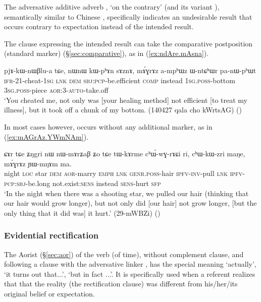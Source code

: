 The adversative additive adverb , `on the contrary' (and its variant ), semantically similar to Chinese , specifically indicates an undesirable result that occurs contrary to expectation instead of the intended result.

The clause expressing the intended result can take the comparative postposition (standard marker)  (§\ref{sec:comparative}), as in (\ref{ex:ndAre.mAsna}).

\begin{exe}
\ex \label{ex:sAznA.mAGrAZ}
\gll pjɤ-kɯ-nɯβlu-a tɕe, nɯnɯ kɯ-pʰɤn sɤznɤ, mɤ́ɣrɤz a-mpʰɯz ɯ-ntɕʰɯr pa-nɯ-pʰɯt \\
\textsc{ifr}-2\fl{}1-cheat-\textsc{1sg} \textsc{lnk} \textsc{dem} \textsc{sbj}:\textsc{pcp}-be.efficient \textsc{comp} instead \textsc{1sg}.\textsc{poss}-bottom \textsc{3sg}.\textsc{poss}-piece \textsc{aor}:3\flobv{}-\textsc{auto}-take.off \\
\glt `You cheated me, not only was [your healing method] not efficient [to treat my illness], but it took off a chunk of my bottom. (140427 qala cho kWrtsAG)
()
\end{exe} 

In most cases however,  occurs without any additional marker, as in (\ref{ex:mAGrAz.YWmNAm}).

\begin{exe}
\ex \label{ex:mAGrAz.YWmNAm}
\gll  ɕɤr tɕe ʑŋgri nɯ nɯ-mɤrʑaβ ʑo tɕe tɯ-kɤrme cʰɯ́-wɣ-rɤɕi ri, cʰɯ-kɯ-zri maŋe, mɤ́ɣrɤz ɲɯ-mŋɤm ma. \\
night \textsc{loc} star \textsc{dem} \textsc{aor}-marry \textsc{emph} \textsc{lnk} \textsc{genr}.\textsc{poss}-hair \textsc{ipfv}-\textsc{inv}-pull \textsc{lnk} \textsc{ipfv}-\textsc{pcp}:\textsc{sbj}-be.long not.exist:\textsc{sens} instead \textsc{sens}-hurt \textsc{sfp} \\
\glt `In the night when there was a shooting star, we pulled our hair (thinking that our hair would grow longer), but not only did [our hair] not grow longer, [but the only thing that it did was] it hurt.' (29-mWBZi)
()
\end{exe} 

 \subsubsection{Evidential rectification} \label{sec:evd.rectification.clauses}
 The Aorist  (§\ref{sec:aor}) of the verb  (of time),  without complement clause, and following a clause with the adversative linker , has the special meaning `actually', `it turns out that...', `but in fact ...'. It is specifically used when a referent realizes that that the reality (the rectification clause) was different from his/her/its original belief or expectation. 

